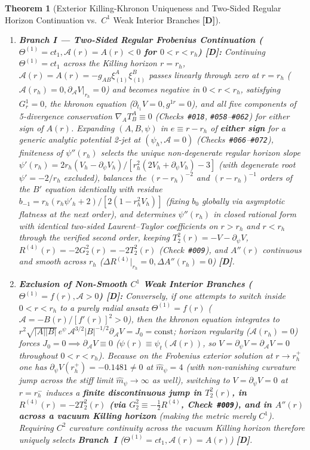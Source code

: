 \documentclass[11pt,a4paper]{article}
\newcommand{\catD}{\textbf{\textcolor{blue!75!black}{[D]}}}
\theoremstyle{plain}
\newtheorem{theorem}{Theorem}[section]
\theoremstyle{definition}
\theoremstyle{remark}
\numberwithin{equation}{section}
\begin{document}
\begin{theorem}[Exterior Killing-Khronon Uniqueness and Two-Sided Regular Horizon Continuation vs.\ $C^1$ Weak Interior Branches \catD]
\begin{enumerate}
  \item[\textnormal{(ii)}] \textbf{Branch I — Two-Sided Regular Frobenius Continuation ($\Theta^{(1)} = c t_1, \mathcal{A}(r) = A(r) < 0$ for $0 < r < r_h$) \catD:} Continuing $\Theta^{(1)} = c t_1$ across the Killing horizon $r = r_h$, $\mathcal{A}(r) = A(r) = -g_{AB}\xi_{(1)}^A\xi_{(1)}^B$ passes linearly through zero at $r = r_h$ ($\mathcal{A}(r_h) = 0, \partial_{\mathcal{A}}V|_{r_h} = 0$) and becomes negative in $0 < r < r_h$, satisfying $G^1_r = 0$, the khronon equation ($\partial_{t_1}V = 0, g^{1r} = 0$), and all five components of 5-divergence conservation $\nabla_A T^A_B \equiv 0$ (Checks~\texttt{\#018}, \texttt{\#058}--\texttt{\#062}) for either sign of $A(r)$. Expanding $(A, B, \psi)$ in $e \equiv r - r_h$ of \textbf{either sign} for a generic analytic potential 2-jet at $(\psi_h, \mathcal{A} = 0)$ (Checks~\texttt{\#066}--\texttt{\#072}), finiteness of $\psi''(r_h)$ selects the unique non-degenerate regular horizon slope $\psi'(r_h) = 2r_h(V_h - \partial_{\psi}V_h)/[r_h^2(2V_h + \partial_{\psi}V_h) - 3]$ (with degenerate root $\psi' = -2/r_h$ excluded), balances the $(r - r_h)^{-2}$ and $(r - r_h)^{-1}$ orders of the $B'$ equation identically with residue $b_{-1} = r_h(r_h\psi'_h + 2)/[2(1 - r_h^2 V_h)]$ (fixing $b_0$ globally via asymptotic flatness at the next order), and determines $\psi''(r_h)$ in closed rational form with identical two-sided Laurent--Taylor coefficients on $r > r_h$ and $r < r_h$ through the verified second order, keeping $T^2_2(r) = -V - \partial_{\psi}V$, $R^{(4)}(r) = -2 G^2_2(r) = -2 T^2_2(r)$ (Check~\texttt{\#009}), and $A''(r)$ continuous and smooth across $r_h$ ($\Delta R^{(4)}\big|_{r_h} = 0, \Delta A''(r_h) = 0$) \catD.
  \item[\textnormal{(iii)}] \textbf{Exclusion of Non-Smooth $C^1$ Weak Interior Branches ($\Theta^{(1)} = f(r), \mathcal{A} > 0$) \catD:} Conversely, if one attempts to switch inside $0 < r < r_h$ to a purely radial ansatz $\Theta^{(1)} = f(r)$ ($\mathcal{A} = -B(r)/[f'(r)]^2 > 0$), then the khronon equation integrates to $r^2\sqrt{|A||B|}\,e^{\psi}\,\mathcal{A}^{3/2}|B|^{-1/2}\partial_{\mathcal{A}}V = J_0 = \text{const}$; horizon regularity ($\mathcal{A}(r_h) = 0$) forces $J_0 = 0 \implies \partial_{\mathcal{A}}V \equiv 0$ ($\psi(r) \equiv \psi_t(\mathcal{A}(r))$, so $V = \partial_{\psi}V = \partial_{\mathcal{A}}V = 0$ throughout $0 < r < r_h$). Because on the Frobenius exterior solution at $r \to r_h^+$ one has $\partial_{\psi}V(r_h^+) = -0.1481 \neq 0$ at $\hat{m}_{\psi} = 4$ (with non-vanishing curvature jump across the stiff limit $\hat{m}_{\psi} \to \infty$ as well), switching to $V = \partial_{\psi}V = 0$ at $r = r_h^-$ induces a \textbf{finite discontinuous jump in $T^2_2(r)$, in $R^{(4)}(r) = -2T^2_2(r)$ (via $G^2_2 \equiv -\frac{1}{2}R^{(4)}$, Check~\texttt{\#009}), and in $A''(r)$ across a vacuum Killing horizon} (making the metric merely $C^1$). Requiring $C^2$ curvature continuity across the vacuum Killing horizon therefore uniquely selects \textbf{Branch~I} ($\Theta^{(1)} = ct_1, \mathcal{A}(r) = A(r)$) \catD.

\end{enumerate}
\end{theorem}
\end{document}
